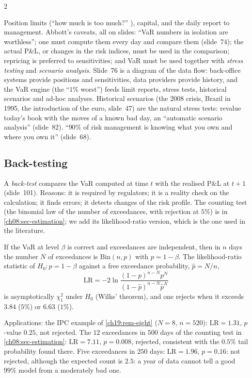 \begin{paracol}{2}
\begin{finance}\label{ch19:fin-uses}
Position limits (``how much is too much?'' ), capital, and the daily report to management. Abbott's caveats, all on slides: ``VaR numbers in isolation are worthless''; one must compute them every day and compare them (slide~74); the actual P\&L, or changes in the risk indices, must be used in the comparison; repricing is preferred to sensitivities; and VaR must be used together with \emph{stress testing} and \emph{scenario analysis}. Slide~76 is a diagram of the data flow: back-office systems provide positions and sensitivities, data providers provide history, and the VaR engine (the ``$1\%$ worst'') feeds limit reports, stress tests, historical scenarios and ad-hoc analyses. Historical scenarios (the 2008 crisis, Brazil in 1995, the introduction of the euro, slide~47) are the natural stress tests: revalue today's book with the moves of a known bad day, an ``automatic scenario analysis'' (slide~82). ``$90\%$ of risk management is knowing what you own and where you own it'' (slide~68).
\end{finance}

\subsection{Back-testing}
A \emph{back-test} compares the VaR computed at time $t$ with the realised P\&L at $t+1$ (slide~101). Reasons: it is required by regulators; it is a reality check on the calculation; it finds errors; it detects changes of the risk profile. The counting test (the binomial law of the number of exceedances, with rejection at $5\%$) is in \cref{ch08:sec-estimation}; we add its likelihood-ratio version, which is the one used in the literature.

\begin{proposition}\label{ch19:prop-kupiec}
If the VaR at level $\beta$ is correct and exceedances are independent, then in $n$ days the number $N$ of exceedances is $\mathrm{Bin}(n,p)$ with $p=1-\beta$. The likelihood-ratio statistic of $H_0\colon p=1-\beta$ against a free exceedance probability, $\hat p=N/n$,
\[
  \mathrm{LR}=-2\ln\frac{(1-p)^{n-N}p^{N}}{(1-\hat p)^{n-N}\hat p^{N}}
\]
is asymptotically $\chi^2_1$ under $H_0$ (Wilks' theorem), and one rejects when it exceeds $3.84$ ($5\%$) or $6.63$ ($1\%$).
\end{proposition}
Applications: the IPC example of \cref{ch19:rem-eight} ($N=8$, $n=520$): $\mathrm{LR}=1.31$, $p$-value $0.25$, not rejected. The $12$ exceedances in $500$ days of the counting test in \cref{ch08:sec-estimation}: $\mathrm{LR}=7.11$, $p=0.008$, rejected, consistent with the $0.5\%$ tail probability found there. Five exceedances in $250$ days: $\mathrm{LR}=1.96$, $p=0.16$: not rejected, although the expected count is $2.5$: a year of data cannot tell a good $99\%$ model from a moderately bad one.


\end{paracol}
